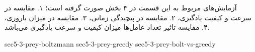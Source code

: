 آزمایش‌های مربوط به این قسمت در ۴ بخش صورت گرفته است؛ ۱. مقایسه در سرعت و کیفیت یادگیری، ۲. مقایسه در پیچیدگی زمانی، ۳. مقایسه در میزان باروری، ۴. مقایسه تاثیر تعداد عامل‌ها میزان کیفیت و سرعت یادگیری می‌باشد.

{sec5-3-prey-boltzmann}
{sec5-3-prey-greedy}
{sec5-3-prey-bolt-vs-greedy}